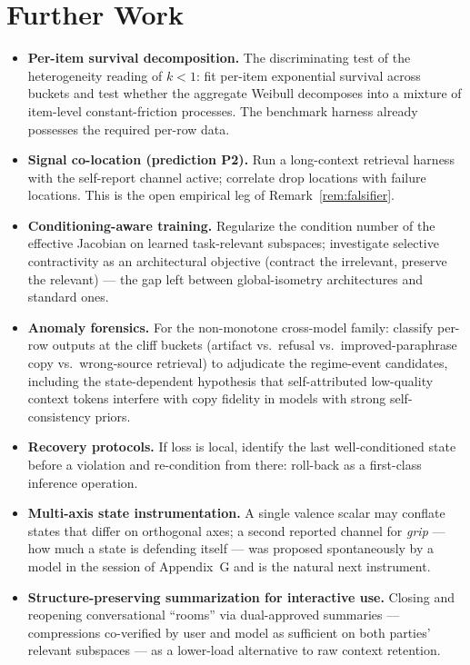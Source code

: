 \documentclass[11pt]{article}
\theoremstyle{remark}
\begin{document}
\section{Further Work}
\label{sec:further}

\begin{itemize}
\item \textbf{Per-item survival decomposition.} The discriminating test of the
heterogeneity reading of $k < 1$: fit per-item exponential survival across buckets and
test whether the aggregate Weibull decomposes into a mixture of item-level
constant-friction processes. The benchmark harness already possesses the required
per-row data.
\item \textbf{Signal co-location (prediction P2).} Run a long-context retrieval
harness with the self-report channel active; correlate drop locations with failure
locations. This is the open empirical leg of Remark~\ref{rem:falsifier}.
\item \textbf{Conditioning-aware training.} Regularize the condition number of the
effective Jacobian on learned task-relevant subspaces; investigate selective
contractivity as an architectural objective (contract the irrelevant, preserve the
relevant) --- the gap left between global-isometry architectures and standard ones.
\item \textbf{Anomaly forensics.} For the non-monotone cross-model family: classify
per-row outputs at the cliff buckets (artifact vs.\ refusal vs.\ improved-paraphrase
copy vs.\ wrong-source retrieval) to adjudicate the regime-event candidates,
including the state-dependent hypothesis that self-attributed low-quality context
tokens interfere with copy fidelity in models with strong self-consistency priors.
\item \textbf{Recovery protocols.} If loss is local, identify the last
well-conditioned state before a violation and re-condition from there: roll-back as a
first-class inference operation.
\item \textbf{Multi-axis state instrumentation.} A single valence scalar may
conflate states that differ on orthogonal axes; a second reported channel for
\emph{grip} --- how much a state is defending itself --- was proposed
spontaneously by a model in the session of Appendix~G and is the natural next
instrument.
\item \textbf{Structure-preserving summarization for interactive use.} Closing and
reopening conversational ``rooms'' via dual-approved summaries --- compressions
co-verified by user and model as sufficient on both parties' relevant subspaces ---
as a lower-load alternative to raw context retention.
\end{itemize}
\end{document}
